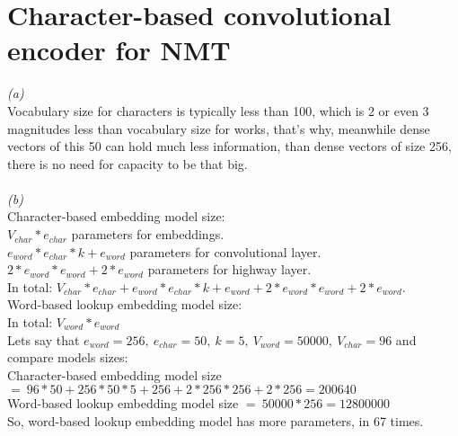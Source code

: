 \documentclass{article}
\begin{document}
\section{Character-based convolutional encoder for NMT}
\textit{(a)} \\
\hspace*{0.2cm}Vocabulary size for characters is typically less than 100, which is 2 or even 3 magnitudes less than vocabulary size for works, that's why, meanwhile dense vectors of this 50 can hold much less information, than dense vectors of size 256, there is no need for capacity to be that big. \\ \\
\textit{(b)} \\
\hspace*{0.2cm}Character-based embedding model size: \\
\hspace*{0.4cm}$V_{char} * e_{char}$ parameters for embeddings. \\
\hspace*{0.4cm}$e_{word} * e_{char} * k + e_{word}$ parameters for convolutional layer. \\
\hspace*{0.4cm}$2 * e_{word} * e_{word} + 2 * e_{word}$ parameters for highway layer. \\
\hspace*{0.4cm}In total: $V_{char} * e_{char} + e_{word} * e_{char} * k + e_{word} + 2 * e_{word} * e_{word} + 2 * e_{word}$. \\
\hspace*{0.2cm}Word-based lookup embedding model size: \\
\hspace*{0.4cm}In total: $V_{word} * e_{word}$ \\
\hspace*{0.2cm}Lets say that $e_{word} = 256, \: e_{char} = 50, \: k = 5, \: V_{word} = 50000, \: V_{char} = 96$ and compare models sizes: \\
\hspace*{0.4cm}Character-based embedding model size $= \: 96 * 50 + 256 * 50 * 5 + 256 + 2 * 256 * 256 + 2 * 256 = 200640$ \\
\hspace*{0.4cm}Word-based lookup embedding model size $= \: 50000 * 256 = 12800000$ \\
\hspace*{0.4cm} So, word-based lookup embedding model has more parameters, in 67 times. \\ \\
\end{document}
